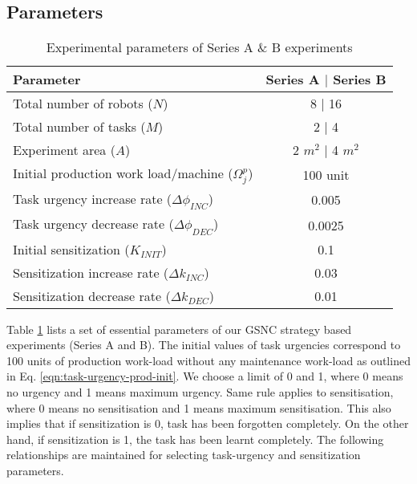 \documentclass[journal]{IEEEtran}
\begin{document}
\subsection{Parameters}
\begin{table}[t]
\caption{Experimental parameters of Series A \& B experiments}
\label{table:params}
\begin{center}
\begin{tabular}{|p{1.5in}|c|}
\hline Parameter & Series A $\mid$ Series B\\
\hline Total number of robots ($N$) & \hspace*{0.1cm} 8 $\mid$ 16\\
\hline Total number of tasks ($M$) & 2 $\mid$ 4\\
\hline Experiment area ($A$) & 2 $m^2$ $\mid$  4 $m^2$\\
\hline Initial production work load/machine ($\Omega_{j}^{p}$) & 100 unit \\
\hline Task urgency increase rate ($\Delta\phi_{INC}$) & 0.005\\
\hline Task urgency decrease rate ($\Delta\phi_{DEC}$) & 0.0025\\
\hline Initial sensitization ($K_{INIT}$) & 0.1\\
\hline Sensitization increase rate ($\Delta k_{INC}$) & 0.03\\
\hline Sensitization decrease rate ($\Delta k_{DEC}$) & 0.01\\
\hline
\end{tabular}
\end{center}
\end{table}
Table \ref{table:params} lists a set of essential parameters of our GSNC strategy based experiments (Series A and B). %
The initial values of task urgencies correspond to 100 units of production work-load without any maintenance work-load as outlined in Eq. \ref{eqn:task-urgency-prod-init}. We choose a limit of 0 and 1, where 0 means no urgency and 1 means maximum urgency. Same rule applies to sensitisation, where 0 means no sensitisation and 1 means maximum sensitisation. This also implies that if sensitization is 0, task has been forgotten completely. On the other hand, if sensitization is 1, the task has been learnt completely.  The following relationships are maintained for selecting task-urgency and sensitization parameters.
\end{document}

